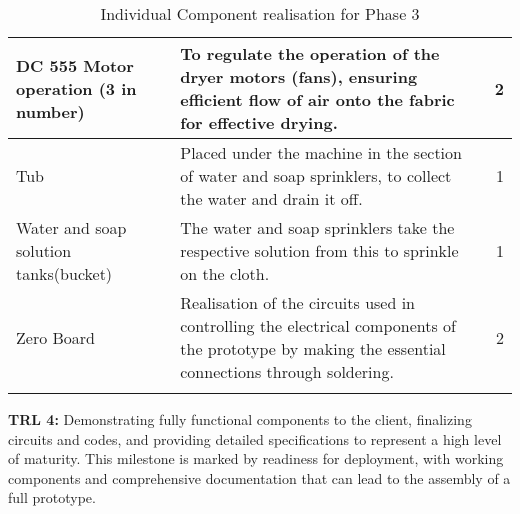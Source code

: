 \documentclass[table,french,english]{rapportCS}
\begin{document}
\begin{longtable}{|>{\raggedright}p{3cm}|p{10cm}|r|}
\hline
DC 555 Motor operation (3 in number) & To regulate the operation of the dryer motors (fans), ensuring efficient flow of air onto the fabric for effective drying.& 2 \\
\hline
Tub	& Placed under the machine in the section of water and soap sprinklers, to collect the water and drain it off. & 1 \\
\hline
Water and soap solution tanks(bucket) & The water and soap sprinklers take the respective solution from this to sprinkle on the cloth. & 1 \\
\hline
Zero Board & Realisation of the circuits used in controlling the electrical components of the prototype by making the essential connections through soldering. & 2 \\
\hline

\caption{Individual Component realisation for Phase 3}
\end{longtable}


\textbf{TRL 4:} Demonstrating fully functional components to the client, finalizing circuits and codes, and providing detailed specifications to represent a high level of maturity. This milestone is marked by readiness for deployment, with working components and comprehensive documentation that can lead to the assembly of a full prototype.
\end{document}
